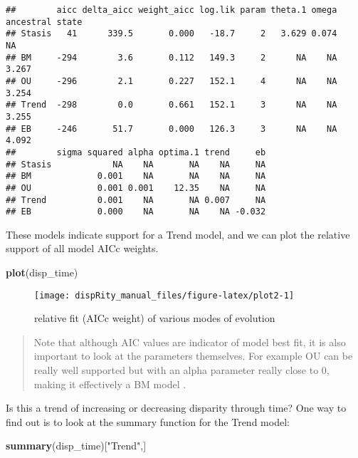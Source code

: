 \documentclass[
]{book}
\newenvironment{Shaded}{\begin{snugshade}}{\end{snugshade}}
\newcommand{\KeywordTok}[1]{\textcolor[rgb]{0.13,0.29,0.53}{\textbf{#1}}}
\newcommand{\NormalTok}[1]{#1}
\newcommand{\StringTok}[1]{\textcolor[rgb]{0.31,0.60,0.02}{#1}}
\begin{document}
\begin{verbatim}
##        aicc delta_aicc weight_aicc log.lik param theta.1 omega ancestral state
## Stasis   41      339.5       0.000   -18.7     2   3.629 0.074              NA
## BM     -294        3.6       0.112   149.3     2      NA    NA           3.267
## OU     -296        2.1       0.227   152.1     4      NA    NA           3.254
## Trend  -298        0.0       0.661   152.1     3      NA    NA           3.255
## EB     -246       51.7       0.000   126.3     3      NA    NA           4.092
##        sigma squared alpha optima.1 trend     eb
## Stasis            NA    NA       NA    NA     NA
## BM             0.001    NA       NA    NA     NA
## OU             0.001 0.001    12.35    NA     NA
## Trend          0.001    NA       NA 0.007     NA
## EB             0.000    NA       NA    NA -0.032
\end{verbatim}

These models indicate support for a Trend model, and we can plot the relative support of all model AICc weights.

\begin{Shaded}
\begin{Highlighting}[]
\KeywordTok{plot}\NormalTok{(disp\_time)}
\end{Highlighting}
\end{Shaded}

\begin{figure}

{\centering \texttt{[image: dispRity\_manual\_files/figure-latex/plot2-1]} 

}

\caption{relative fit (AICc weight) of various modes of evolution}\label{fig:plot2}
\end{figure}

\begin{quote}
Note that although AIC values are indicator of model best fit, it is also important to look at the parameters themselves.
For example OU can be really well supported but with an alpha parameter really close to 0, making it effectively a BM model \citep{Cooper2016}.
\end{quote}

Is this a trend of increasing or decreasing disparity through time? One way to find out is to look at the summary function for the Trend model:

\begin{Shaded}
\begin{Highlighting}[]
\KeywordTok{summary}\NormalTok{(disp\_time)[}\StringTok{"Trend"}\NormalTok{,]}
\end{Highlighting}
\end{Shaded}
\end{document}
